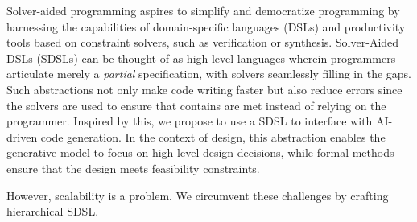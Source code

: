 Solver-aided programming aspires to simplify and democratize programming by harnessing the capabilities of domain-specific languages (DSLs) and productivity tools based on constraint solvers, such as verification or synthesis. Solver-Aided DSLs (SDSLs) can be thought of as high-level languages wherein programmers articulate merely a \emph{partial} specification, with solvers seamlessly filling in the gaps. Such abstractions not only make code writing faster but also reduce errors since the solvers are used to ensure that contains are met instead of relying on the programmer. Inspired by this, we propose to use a SDSL to interface with AI-driven code generation. In the context of design, this abstraction enables the generative model to focus on high-level design decisions, while formal methods ensure that the design meets feasibility constraints. 

However, scalability is a problem. We circumvent these challenges by crafting hierarchical SDSL.

\fi